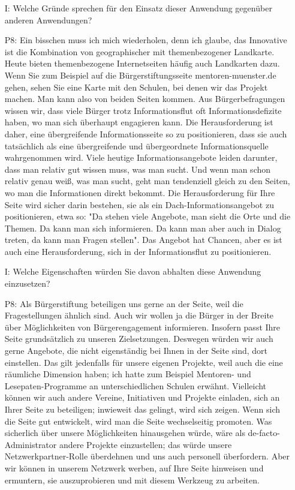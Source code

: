 \begin{itemize}
    \item[I:] Welche Gr{\"u}nde sprechen f{\"u}r den Einsatz dieser Anwendung gegen{\"u}ber anderen Anwendungen?
    \item[P8:] Ein bisschen muss ich mich wiederholen, denn ich glaube, das Innovative ist die Kombination von geographischer mit themenbezogener Landkarte. Heute bieten themenbezogene Internetseiten h{\"a}ufig auch Landkarten dazu. Wenn Sie zum Beispiel auf die B{\"u}rgerstiftungsseite mentoren-muenster.de gehen, sehen Sie eine Karte mit den Schulen, bei denen wir das Projekt machen. Man kann also von beiden Seiten kommen. Aus B{\"u}rgerbefragungen wissen wir, dass viele B{\"u}rger trotz Informationsflut oft Informationsdefizite haben, wo man sich {\"u}berhaupt engagieren kann. Die Herausforderung ist daher, eine {\"u}bergreifende Informationsseite so zu positionieren, dass sie auch tats{\"a}chlich als eine {\"u}bergreifende und {\"u}bergeordnete Informationsquelle wahrgenommen wird. Viele heutige Informationsangebote leiden darunter, dass man relativ gut wissen muss, was man sucht. Und wenn man schon relativ genau wei{\ss}, was man sucht, geht man tendenziell gleich zu den Seiten, wo man die Informationen direkt bekommt. Die Herausforderung f{\"u}r Ihre Seite wird sicher darin bestehen, sie als ein Dach-Informationsangebot zu positionieren, etwa so: "Da stehen viele Angebote, man sieht die Orte und die Themen. Da kann man sich informieren. Da kann man aber auch in Dialog treten, da kann man Fragen stellen". Das Angebot hat Chancen, aber es ist auch eine Herausforderung, sich in der Informationsflut zu positionieren.
    \item[I:] Welche Eigenschaften w{\"u}rden Sie davon abhalten diese Anwendung einzusetzen?
    \item[P8:] Als B{\"u}rgerstiftung beteiligen uns gerne an der Seite, weil die Fragestellungen {\"a}hnlich sind. Auch wir wollen ja die B{\"u}rger in der Breite {\"u}ber M{\"o}glichkeiten von B{\"u}rgerengagement informieren. Insofern passt Ihre Seite grunds{\"a}tzlich zu unseren Zielsetzungen. Deswegen w{\"u}rden wir auch gerne Angebote, die nicht eigenst{\"a}ndig bei Ihnen in der Seite sind, dort einstellen. Das gilt jedenfalls f{\"u}r unsere eigenen Projekte, weil auch die eine r{\"a}umliche Dimension haben; ich hatte zum Beispiel Mentoren- und Lesepaten-Programme an unterschiedlichen Schulen erw{\"a}hnt. Vielleicht k{\"o}nnen wir auch andere Vereine, Initiativen und Projekte einladen, sich an Ihrer Seite zu beteiligen; inwieweit das gelingt, wird sich zeigen. Wenn sich die Seite gut entwickelt, wird man die Seite wechselseitig promoten. Was sicherlich {\"u}ber unsere M{\"o}glichkeiten hinausgehen w{\"u}rde, w{\"a}re als de-facto-Administrator andere Projekte einzustellen; das w{\"u}rde unsere Netzwerkpartner-Rolle {\"u}berdehnen und uns auch personell {\"u}berfordern. Aber wir k{\"o}nnen in unserem Netzwerk werben, auf Ihre Seite hinweisen und ermuntern, sie auszuprobieren und mit diesem Werkzeug zu arbeiten.

\end{itemize}
